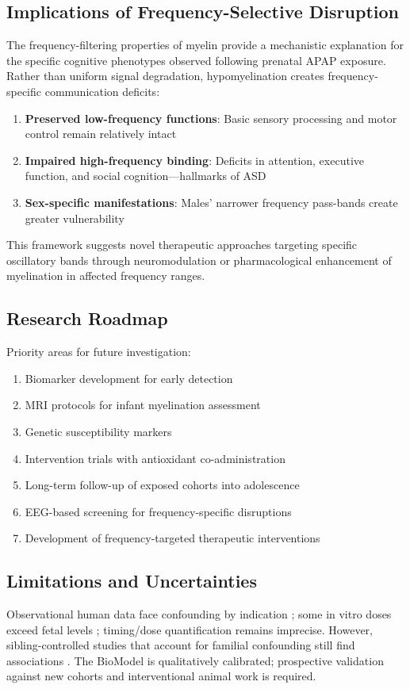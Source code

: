 \documentclass[12pt]{article}
\begin{document}
\subsection{Implications of Frequency-Selective Disruption}
The frequency-filtering properties of myelin provide a mechanistic explanation for the specific cognitive phenotypes observed following prenatal APAP exposure. Rather than uniform signal degradation, hypomyelination creates frequency-specific communication deficits:

\begin{enumerate}
\item \textbf{Preserved low-frequency functions}: Basic sensory processing and motor control remain relatively intact
\item \textbf{Impaired high-frequency binding}: Deficits in attention, executive function, and social cognition---hallmarks of ASD
\item \textbf{Sex-specific manifestations}: Males' narrower frequency pass-bands create greater vulnerability
\end{enumerate}

This framework suggests novel therapeutic approaches targeting specific oscillatory bands through neuromodulation or pharmacological enhancement of myelination in affected frequency ranges.

\subsection{Research Roadmap}
Priority areas for future investigation:
\begin{enumerate}
\item Biomarker development for early detection \citep{ji2020}
\item MRI protocols for infant myelination assessment \citep{baker2020}
\item Genetic susceptibility markers \citep{leppert2019,schultz2008}
\item Intervention trials with antioxidant co-administration \citep{parker2020}
\item Long-term follow-up of exposed cohorts into adolescence \citep{liew2021}
\item EEG-based screening for frequency-specific disruptions
\item Development of frequency-targeted therapeutic interventions
\end{enumerate}

\subsection{Limitations and Uncertainties}
Observational human data face confounding by indication \citep{liew2016}; some in vitro doses exceed fetal levels \citep{perez2012}; timing/dose quantification remains imprecise. However, sibling-controlled studies that account for familial confounding still find associations \citep{brandlistuen2013,stergiakouli2016}. The BioModel is qualitatively calibrated; prospective validation against new cohorts and interventional animal work is required.
\end{document}
